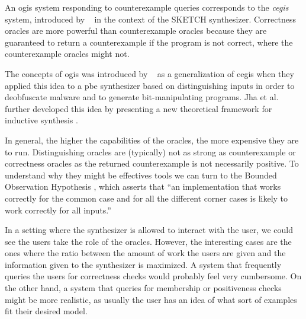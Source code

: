 An \gls{ogis} system responding to counterexample queries corresponds to the
\textit{\gls{cegis}} system, introduced by
\citeauthor{Solar-Lezama:2008}~\cite{Solar-Lezama:2008} in the context of the
SKETCH synthesizer. Correctness oracles are more powerful than counterexample
oracles because they are guaranteed to return a counterexample if the program is
not correct, where the counterexample oracles might not.

The concepts of \gls{ogis} was introduced by
\citeauthor{Jha:2017:TFS}~\cite{Jha:2017:TFS} as a generalization of \gls{cegis}
when they applied this idea to a \gls{pbe} synthesizer based on distinguishing
inputs in order to deobfuscate malware and to generate bit-manipulating
programs. Jha et al. further developed this idea by presenting a new theoretical
framework for inductive synthesis \cite{Jha:2017:TFS}.

In general, the higher the capabilities of the oracles, the more expensive they
are to run. Distinguishing oracles are (typically) not as strong as
counterexample or correctness oracles as the returned counterexample is not
necessarily positive. To understand why they might be effectives tools we can
turn to the Bounded Observation Hypothesis \cite{Solar-Lezama:2008}, which
asserts that ``an implementation that works correctly for the common case and
for all the different corner cases is likely to work correctly for all inputs.''

In a setting where the synthesizer is allowed to interact with the user, we
could see the users take the role of the oracles.
However, the interesting cases are the ones where the ratio between the amount
of work the users are given and the information given to the synthesizer is
maximized.
A system that frequently queries the users for correctness checks would probably
feel very cumbersome.
On the other hand, a system that queries for membership or positiveness checks
might be more realistic, as usually the user has an idea of what sort of
examples fit their desired model.
